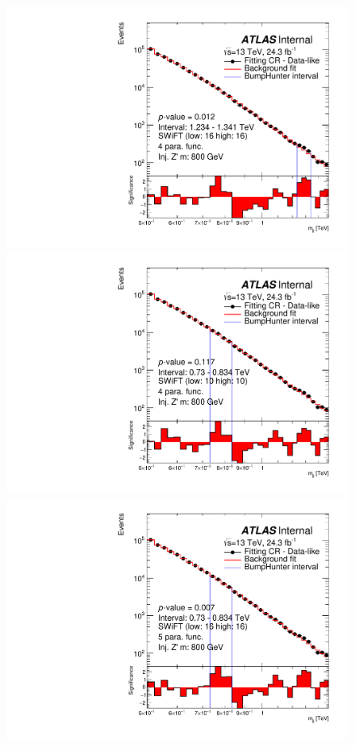 \begin{figure}[!htb]
\captionsetup[subfigure]{aboveskip=0pt,justification=centering}
\centering
{} {
  \includegraphics[width=0.45\linewidth, angle=0]{figs/Dibjet/LowMass/FitStudy/bhFit_corrFitCR_dataLike_4para_low16_high16_inj_Zprimebb800_xsFactor1.pdf}
}
 {
  \includegraphics[width=0.45\linewidth, angle=0]{figs/Dibjet/LowMass/FitStudy/bhFit_corrFitCR_dataLike_4para_low10_high10_inj_Zprimebb800_xsFactor1.pdf}
}
 {
  \includegraphics[width=0.45\linewidth, angle=0]{figs/Dibjet/LowMass/FitStudy/bhFit_corrFitCR_dataLike_5para_low16_high16_inj_Zprimebb800_xsFactor1.pdf}
}
\end{figure}
